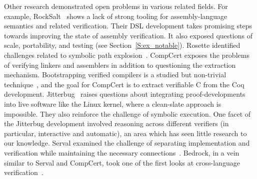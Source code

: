 Other research demonstrated open problems in various related fields. For
example, RockSalt~\cite{Morrisett_2012} shows a lack of strong tooling for
assembly-language semantics and related verification. Their DSL development
takes promising steps towards improving the state of assembly verification. It
also exposed questions of scale, portability, and testing (see
Section~\ref{S:ex_notable}). Rosette identified challenges related to symbolic
path explosion~\cite{Bornholt_2018,Porncharoenwase_2020}. CompCert exposes the
problems of verifying linkers and assemblers in addition to questioning the
extraction mechanism. Bootstrapping verified compilers is a studied but
non-trivial technique~\cite{Konat_2016,Myreen_2021}, and the goal for CompCert
is to extract verifiable C from the Coq development. Jitterbug~\cite{258848}
raises questions about integrating proof-developments into live software like
the Linux kernel, where a clean-slate approach is impossible. They also
reinforce the challenge of symbolic execution. One facet of the Jitterbug
development involved reasoning across different verifiers (in particular,
interactive and automatic), an area which has seen little research to our
knowledge. Serval examined the challenge of separating implementation and
verification while maintaining the necessary connections~\cite{Nelson_2019}.
Bedrock, in a vein similar to Serval and CompCert, took one of the first looks
at cross-language verification~\cite{Wang_2014}.
